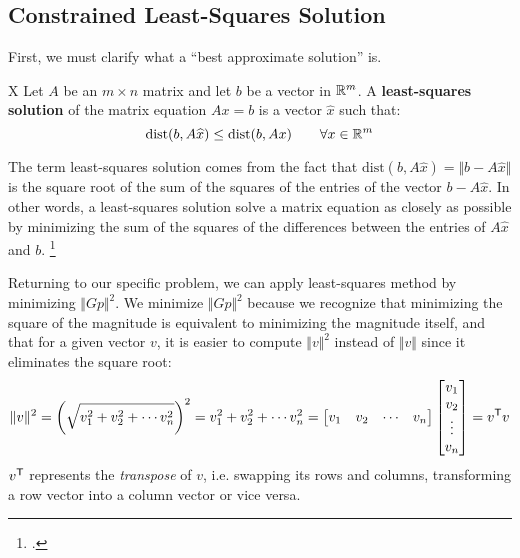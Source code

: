 \subsection{Constrained Least-Squares Solution} \label{sec:clss}

First, we must clarify what a ``best approximate solution'' is. 
\begin{definition}X
    Let $A$ be an $m \times n$ matrix and let $b$ be a vector in $\mathbb{R}^m$. A \textbf{least-squares solution} of the matrix equation $Ax = b$ is a vector $\widehat{x}$ such that:
    \begin{equation*}
        \mathrm{dist}(b, A\widehat{x}) \leq \mathrm{dist}(b, Ax) \qquad \forall x \in \mathbb{R}^m
    \end{equation*}
\end{definition}

The term least-squares solution comes from the fact that $\mathrm{dist}(b, A\widehat{x})= \Vert b - A\widehat{x} \Vert$ is the square root of the sum of the squares of the entries of the vector $b - A\widehat{x}$. In other words, a least-squares solution solve a matrix equation as closely as possible by minimizing the sum of the squares of the differences between the entries of $A\widehat{x}$ and $b$. \footcite{margalitMethodLeast}

Returning to our specific problem, we can apply least-squares method by minimizing $\Vert Gp \Vert^2$. We minimize $\Vert Gp \Vert^2$ because we recognize that minimizing the square of the magnitude is equivalent to minimizing the magnitude itself, and that for a given vector $v$, it is easier to compute $\Vert v \Vert^2$ instead of $\Vert v \Vert$ since it eliminates the square root:
\begin{equation*}
    \Vert v \Vert^2
     = \left(\sqrt{v_1^2+v_2^2+ \cdots v_n^2}\right)^2 
     = v_1^2+v_2^2+ \cdots v_n^2 
     = \begin{bmatrix}
        v_1 & v_2 & \cdots & v_n
    \end{bmatrix}
    \begin{bmatrix}
        v_1 \\ v_2 \\ \vdots \\ v_n
    \end{bmatrix} 
     = v^{\mathsf{T}} v
\end{equation*}
$v^{\mathsf{T}}$ represents the \emph{transpose} of $v$, i.e. swapping its rows and columns, transforming a row vector into a column vector or vice versa.


